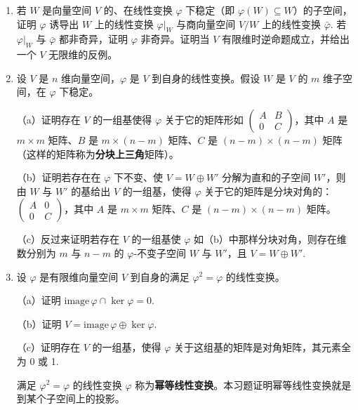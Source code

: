 \begin{enumerate}
（b）若 \(A\) 是关于 \(V\) 的给定基（定义域与陪域都用它）表示 \(\varphi\) 的 \(n \times n\) 矩阵，证明 \(A\) 相似于对角矩阵当且仅当 \(V\) 有一组由 \(\varphi\) 的特征向量组成的基。

\item 若 \(W\) 是向量空间 \(V\) 的、在线性变换 \(\varphi\) 下稳定（即 \(\varphi(W) \subseteq W\)）的子空间，证明 \(\varphi\) 诱导出 \(W\) 上的线性变换 \(\varphi|_W\) 与商向量空间 \(V/W\) 上的线性变换 \(\bar{\varphi}\). 若 \(\varphi|_W\) 与 \(\bar{\varphi}\) 都非奇异，证明 \(\varphi\) 非奇异。证明当 \(V\) 有限维时逆命题成立，并给出一个 \(V\) 无限维的反例。

\item 设 \(V\) 是 \(n\) 维向量空间，\(\varphi\) 是 \(V\) 到自身的线性变换。假设 \(W\) 是 \(V\) 的 \(m\) 维子空间，在 \(\varphi\) 下稳定。

（a）证明存在 \(V\) 的一组基使得 \(\varphi\) 关于它的矩阵形如 \(\begin{pmatrix} A & B \\ 0 & C \end{pmatrix}\)，其中 \(A\) 是 \(m \times m\) 矩阵、\(B\) 是 \(m \times (n-m)\) 矩阵、\(C\) 是 \((n-m) \times (n-m)\) 矩阵（这样的矩阵称为\textbf{分块上三角}矩阵）。

（b）证明若存在在 \(\varphi\) 下不变、使 \(V = W \oplus W'\) 分解为直和的子空间 \(W'\)，则由 \(W\) 与 \(W'\) 的基给出 \(V\) 的一组基，使得 \(\varphi\) 关于它的矩阵是分块对角的：\(\begin{pmatrix} A & 0 \\ 0 & C \end{pmatrix}\)，其中 \(A\) 是 \(m \times m\) 矩阵、\(C\) 是 \((n-m) \times (n-m)\) 矩阵。

（c）反过来证明若存在 \(V\) 的一组基使 \(\varphi\) 如（b）中那样分块对角，则存在维数分别为 \(m\) 与 \(n-m\) 的 \(\varphi\)-不变子空间 \(W\) 与 \(W'\)，且 \(V = W \oplus W'\).

\item 设 \(\varphi\) 是有限维向量空间 \(V\) 到自身的满足 \(\varphi^2 = \varphi\) 的线性变换。

（a）证明 \(\mathrm{image}\,\varphi \cap \ker\varphi = 0\).

（b）证明 \(V = \mathrm{image}\,\varphi \oplus \ker\varphi\).

（c）证明存在 \(V\) 的一组基，使得 \(\varphi\) 关于这组基的矩阵是对角矩阵，其元素全为 0 或 1.

满足 \(\varphi^2 = \varphi\) 的线性变换 \(\varphi\) 称为\textbf{幂等线性变换}。本习题证明幂等线性变换就是到某个子空间上的投影。


\end{enumerate}
